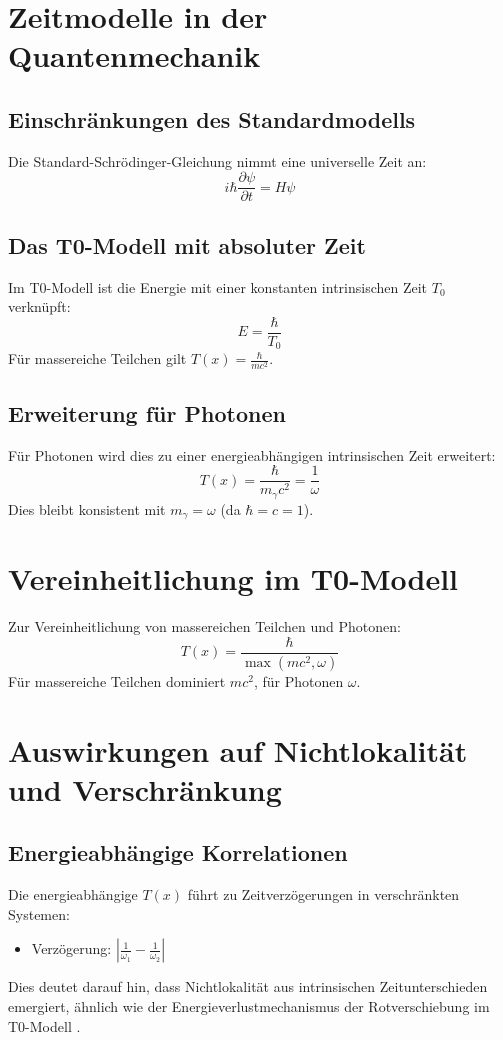 \documentclass[12pt,a4paper]{article}
\newcommand{\Tfield}{T(x)}
\begin{document}
	\section{Zeitmodelle in der Quantenmechanik}
	\subsection{Einschränkungen des Standardmodells}
	Die Standard-Schrödinger-Gleichung nimmt eine universelle Zeit an:
	\begin{equation}
		i\hbar\frac{\partial\psi}{\partial t} = H\psi
	\end{equation}
	
	\subsection{Das T0-Modell mit absoluter Zeit}
	Im T0-Modell ist die Energie mit einer konstanten intrinsischen Zeit \(T_0\) verknüpft:
	\begin{equation}
		E = \frac{\hbar}{T_0}
	\end{equation}
	Für massereiche Teilchen gilt \(\Tfield = \frac{\hbar}{mc^2}\).
	
	\subsection{Erweiterung für Photonen}
	Für Photonen wird dies zu einer energieabhängigen intrinsischen Zeit erweitert:
	\begin{equation}
		\Tfield = \frac{\hbar}{m_\gamma c^2} = \frac{1}{\omega}
	\end{equation}
	Dies bleibt konsistent mit \(m_\gamma = \omega\) (da \(\hbar = c = 1\)).
	
	\section{Vereinheitlichung im T0-Modell}
	Zur Vereinheitlichung von massereichen Teilchen und Photonen:
	\begin{equation}
		\Tfield = \frac{\hbar}{\max(m c^2, \omega)}
	\end{equation}
	Für massereiche Teilchen dominiert \(m c^2\), für Photonen \(\omega\).
	
	\section{Auswirkungen auf Nichtlokalität und Verschränkung}
	\subsection{Energieabhängige Korrelationen}
	Die energieabhängige \(\Tfield\) führt zu Zeitverzögerungen in verschränkten Systemen:
	\begin{itemize}
		\item Verzögerung: \(\left|\frac{1}{\omega_1} - \frac{1}{\omega_2}\right|\)
	\end{itemize}
	Dies deutet darauf hin, dass Nichtlokalität aus intrinsischen Zeitunterschieden emergiert, ähnlich wie der Energieverlustmechanismus der Rotverschiebung im T0-Modell \cite{pascher_messdifferenzen_2025}.
	
\end{document}
